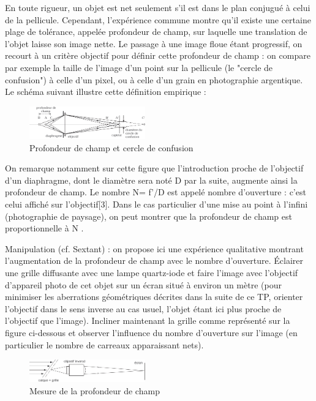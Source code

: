 \documentclass{article}%
\begin{document}
En toute rigueur, un objet est net seulement s'il est dans le plan conjugué à celui de la pellicule. Cependant, l'expérience commune montre qu'il existe une certaine plage de tolérance, appelée profondeur de champ, sur laquelle une translation de l'objet laisse son image nette. Le passage à une image floue étant progressif, on recourt à un critère objectif pour définir cette profondeur de champ : on compare par exemple la taille de l'image d'un point sur la pellicule (le "cercle de confusion") à celle d'un pixel, ou à celle d'un grain en photographie argentique. Le schéma suivant illustre cette définition empirique  :
\begin{figure}
	\centerline{\includegraphics[width=5cm]{images-exp/InstrumentsProfChamp1.png}}
	\caption{Profondeur de champ et cercle de confusion}
\end{figure}

On remarque notamment sur cette figure que l'introduction proche de l'objectif d'un diaphragme, dont le diamètre sera noté D par la suite, augmente ainsi la profondeur de champ. Le nombre N= f'/D est appelé nombre d'ouverture : c'est celui affiché sur l'objectif[3]. Dans le cas particulier d'une mise au point à l'infini (photographie de paysage), on peut montrer que la profondeur de champ est proportionnelle à N .

Manipulation (cf. Sextant) : on propose ici une expérience qualitative montrant l'augmentation de la profondeur de champ avec le nombre d'ouverture. Éclairer une grille diffusante avec une lampe quartz-iode et faire l'image avec l'objectif d'appareil photo de cet objet sur un écran situé à environ un mètre (pour minimiser les aberrations géométriques décrites dans la suite de ce TP, orienter l'objectif dans le sens inverse au cas usuel, l'objet étant ici plus proche de l'objectif que l'image). Incliner maintenant la grille comme représenté sur la figure ci-dessous et observer l'influence du nombre d'ouverture sur l'image (en particulier le nombre de carreaux apparaissant nets).
\begin{figure}
	\centerline{\includegraphics[width=5cm]{images-exp/InstrumentsProfChamp2.png}}
	\caption{Mesure de la profondeur de champ}
\end{figure}
\end{document}
